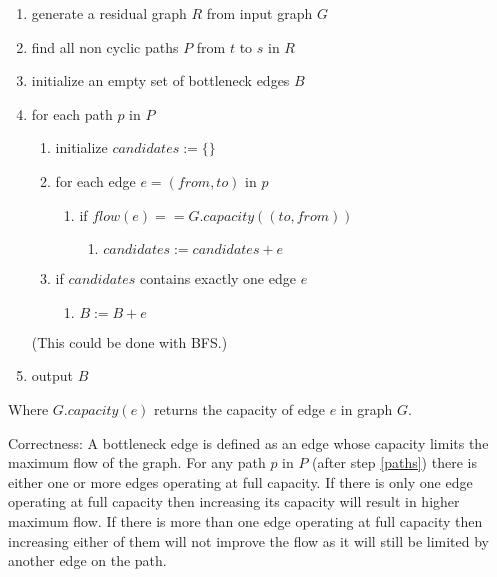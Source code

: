 \documentclass[12pt]{article}
\begin{document}
\begin{enumerate}
	\item generate a residual graph $R$ from input graph $G$
	\item find all non cyclic paths $P$ from $t$ to $s$ in $R$ \label{paths}
	\item initialize an empty set of bottleneck edges $B$
	\item for each path $p$ in $P$
		\begin{enumerate}
			\item initialize $candidates := \{\}$
			\item for each edge $e = (from, to)$ in $p$
			\begin{enumerate}
				\item if $flow(e) == G.capacity((to, from))$
				\begin{enumerate}
					\item $candidates := candidates + e$
				\end{enumerate}
			\end{enumerate}
			\item if $candidates$ contains exactly one edge $e$
			\begin{enumerate}
				\item $B := B + e$
			\end{enumerate}
		\end{enumerate}

	(This could be done with BFS.)
	\item output $B$
\end{enumerate}

Where $G.capacity(e)$ returns the capacity of edge $e$ in graph $G$.

Correctness: A bottleneck edge is defined as an edge whose capacity limits the maximum flow of the graph. For any path $p$ in $P$ (after step \ref{paths}) there is either one or more edges operating at full capacity. If there is only one edge operating at full capacity then increasing its capacity will result in higher maximum flow. If there is more than one edge operating at full capacity then increasing either of them will not improve the flow as it will still be limited by another edge on the path.

\section{} %
\section{} %
\end{document}
